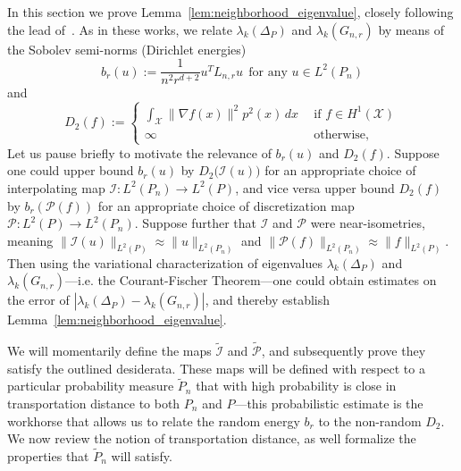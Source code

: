\documentclass{article}
\newcommand{\1}{\mathbf{1}}
\newcommand{\Lap}{L}
\newcommand{\Xset}{\mathcal{X}}
\newcommand{\Leb}{L}
\newcommand{\mc}[1]{\mathcal{#1}}
\newcommand{\wt}[1]{\widetilde{#1}}
\theoremstyle{alden}
\theoremstyle{aldenthm}
\theoremstyle{definition}
\theoremstyle{remark}
\begin{document}
In this section we prove Lemma~\ref{lem:neighborhood_eigenvalue}, closely following the lead of~\citep{burago2014,trillos2019,calder2019}. As in these works, we relate $\lambda_k(\Delta_P)$ and $\lambda_k(G_{n,r})$ by means of the Sobolev semi-norms (Dirichlet energies)
\begin{equation*}
b_r(u) := \frac{1}{n^2 r^{d+ 2}}u^T \Lap_{n,r} u~~\textrm{for any $u \in \Leb^2(P_n)$}
\end{equation*}
and
\begin{equation*}
D_2(f) :=
\begin{cases*}
\int_{\Xset} \|\nabla f(x)\|^2 p^2(x) \,dx~~ &\textrm{if $f \in H^1(\Xset)$} \\
\infty~~ & \textrm{otherwise,}
\end{cases*}
\end{equation*}
Let us pause briefly to motivate the relevance of $b_r(u)$ and $D_2(f)$. Suppose one could upper bound $b_r(u)$ by $D_2\bigl(\mc{I}(u)\bigr)$ for an appropriate choice of interpolating map $\mc{I}: \Leb^2(P_n) \to \Leb^2(P)$, and vice versa upper bound $D_2(f)$ by $b_r(\mc{P}(f))$ for an appropriate choice of discretization map $\mc{P}: \Leb^2(P) \to \Leb^2(P_n)$. Suppose further that $\mc{I}$ and $\mc{P}$ were near-isometries, meaning $\|\mc{I}(u)\|_{\Leb^2(P)} \approx \|u\|_{\Leb^2(P_n)}$ and $\|\mc{P}(f)\|_{\Leb^2(P_n)} \approx \|f\|_{\Leb^2(P)}$. Then using the variational characterization of eigenvalues $\lambda_k(\Delta_P)$ and $\lambda_k(G_{n,r})$---i.e. the Courant-Fischer Theorem---one could obtain estimates on the error of $|\lambda_k(\Delta_P) - \lambda_k(G_{n,r})|$, and thereby establish Lemma~\ref{lem:neighborhood_eigenvalue}.

We will momentarily define the maps $\wt{\mc{I}}$ and $\wt{\mc{P}}$, and subsequently prove they satisfy the outlined desiderata. These maps will be defined with respect to a particular probability measure $\wt{P}_n$ that with high probability is close in transportation distance to both $P_n$ and $P$---this probabilistic estimate is the workhorse that allows us to relate the random energy $b_r$ to the non-random $D_2$.  We now review the notion of transportation distance, as well formalize the properties that $\wt{P}_n$ will satisfy.
\end{document}
